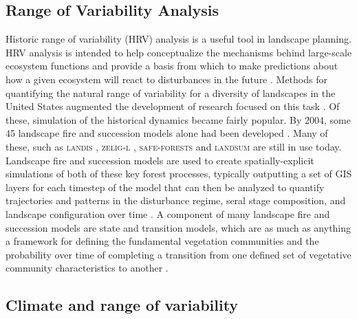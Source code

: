 \subsection{Range of Variability Analysis}
Historic range of variability (HRV) analysis is a useful tool in landscape planning. HRV analysis is intended to help conceptualize the mechanisms behind large-scale ecosystem functions and provide a basis from which to make predictions about how a given ecosystem will react to disturbances in the future \citep{Nonaka2005,Landres1999}. Methods for quantifying the natural range of variability for a diversity of landscapes in the United States augmented the development of research focused on this task \citep{Landres1999}. Of these, simulation of the historical dynamics became fairly popular. By 2004, some 45 landscape fire and succession models alone had been developed \citep{Keane2004}. Many of these, such as \textsc{landis} \citep{He1999}, \textsc{zelig-l} \citep{Miller1999}, \textsc{safe-forests} \cite{Sessions1997} and \textsc{landsum} \citep{Keane2012} are still in use today. Landscape fire and succession models are used to create spatially-explicit simulations of both of these key forest processes, typically outputting a set of GIS layers for each timestep of the model that can then be analyzed to quantify trajectories and patterns in the disturbance regime, seral stage composition, and landscape configuration over time \citep{Keane2004}. A component of many landscape fire and succession models are state and transition models, which are as much as anything a framework for defining the fundamental vegetation communities and the probability over time of completing a transition from one defined set of vegetative community characteristics to another \citep{Stringham2003,Blankenship2015}.


\subsection{Climate and range of variability}

